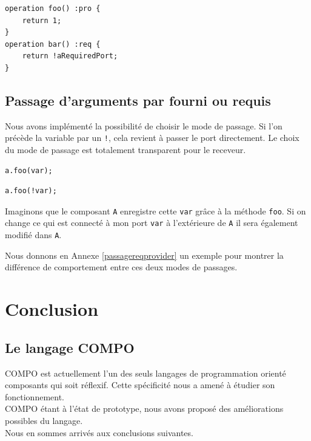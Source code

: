 \documentclass[11pt,a4paper,openany,oneside]{book}
\begin{document}
\begin{lstlisting}[language=COMPO, frame=single, caption=Syntaxe du typage de retour d'opération]
operation foo() :pro {
    return 1;
}
operation bar() :req {
    return !aRequiredPort;
}
\end{lstlisting}

\section{Passage d'arguments par fourni ou requis}

Nous avons implémenté la possibilité de choisir le mode de passage. Si l'on précède la variable par un \texttt{!}, cela revient à passer le port directement. Le choix du mode de passage est totalement transparent pour le receveur.

\begin{lstlisting}[language=COMPO, frame=single, caption=Syntaxe du passage par founis en COMPO]
a.foo(var);
\end{lstlisting}

\begin{lstlisting}[language=COMPO, frame=single, caption=Syntaxe du passage par requis en COMPO]
a.foo(!var);
\end{lstlisting}

Imaginons que le composant \texttt{A} enregistre cette \texttt{var} grâce à la méthode \texttt{foo}. Si on change ce qui est connecté à mon port \texttt{var} à l'extérieure de \texttt{A} il sera également modifié dans \texttt{A}.

Nous donnons en Annexe \ref{passagereqprovider} un exemple pour montrer la différence de comportement entre ces deux modes de passages.

\chapter{Conclusion}

\section{Le langage COMPO}

COMPO est actuellement l'un des seuls langages de programmation orienté composants qui soit réflexif. Cette spécificité nous a amené à étudier son fonctionnement.\\
COMPO étant à l'état de prototype, nous avons proposé des améliorations possibles du langage.\\
Nous en sommes arrivés aux conclusions suivantes.
\end{document}
